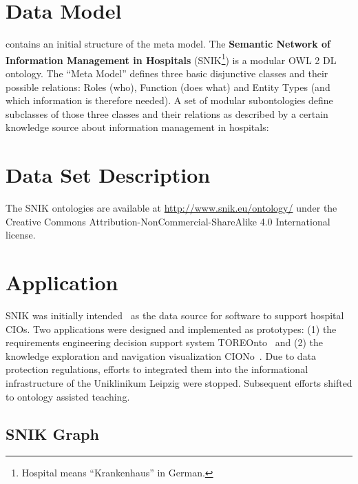 \documentclass[sw]{iosart2x}
\renewcommand{\citet}{\cite}%
\renewcommand{\citep}{\cite}%
\begin{document}
\section{Data Model}\label{sec:architecture}
\citet{domaene} contains an initial structure of the meta model.
The \textbf{Semantic Network of Information Management in Hospitals} (SNIK\footnote{Hospital means \enquote{Krankenhaus} in German.}) is a modular OWL 2 DL ontology.
The \enquote{Meta Model} defines three basic disjunctive classes and their possible relations: Roles (who), Function (does what) and Entity Types (and which information is therefore needed).
A set of modular subontologies define subclasses of those three classes and their relations as described by a certain knowledge source about information management in hospitals:

\section{Data Set Description}\label{sec:dsd}
The SNIK ontologies are available at \url{http://www.snik.eu/ontology/} under the Creative Commons Attribution-NonCommercial-ShareAlike 4.0 International license.

\section{Application}\label{sec:application}
SNIK was initially intended~\citep{domaene} as the data source for software to support hospital CIOs.
Two applications were designed and implemented as prototypes: (1) the requirements engineering decision support system TOREOnto~\citep{toreonto} and (2) the knowledge exploration and navigation visualization CIONo~\citep{ciono}.
Due to data protection regulations, efforts to integrated them into the informational infrastructure of the Uniklinikum Leipzig were stopped.
Subsequent efforts shifted to ontology assisted teaching.

\subsection{SNIK Graph}
\end{document}
